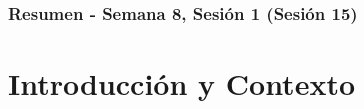 \documentclass[10pt]{beamer}
\begin{document}
\myfront{}

\begin{frame}
  \titlepage
\end{frame}

\begin{frame}
  \frametitle{Resumen - Semana 8, Sesión 1 (Sesión 15)}
  \tableofcontents
\end{frame}


\section{Introducción y Contexto}
\end{document}
